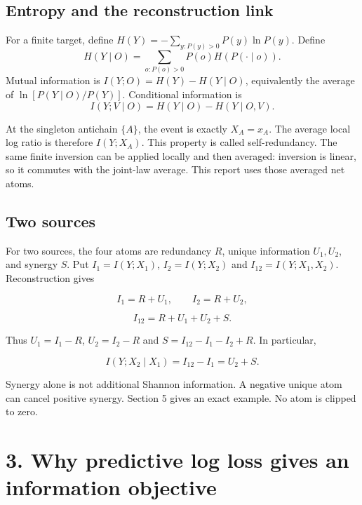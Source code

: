 \documentclass[11pt,a4paper]{article}
\begin{document}
\subsection{Entropy and the reconstruction link}\label{entropy-and-the-reconstruction-link}

For a finite target, define \(H(Y)=-\sum_{y:P(y)>0}P(y)\ln P(y)\). Define \[H(Y\mid O)=\sum_{o:P(o)>0}P(o)H(P(\cdot\mid o)).\] Mutual information is \(I(Y;O)=H(Y)-H(Y\mid O)\), equivalently the average of \(\ln[P(Y\mid O)/P(Y)]\). Conditional information is \[I(Y;V\mid O)=H(Y\mid O)-H(Y\mid O,V).\]

At the singleton antichain \(\{A\}\), the event is exactly \(X_A=x_A\). The average local log ratio is therefore \(I(Y;X_A)\). This property is called self-redundancy. The same finite inversion can be applied locally and then averaged: inversion is linear, so it commutes with the joint-law average. This report uses those averaged net atoms.

\par{}

\subsection{Two sources}\label{two-sources}

For two sources, the four atoms are redundancy \(R\), unique information \(U_1,U_2\), and synergy \(S\). Put \(I_1=I(Y;X_1)\), \(I_2=I(Y;X_2)\) and \(I_{12}=I(Y;X_1,X_2)\). Reconstruction gives

\[
I_1=R+U_1,\qquad I_2=R+U_2,
\]

\[
I_{12}=R+U_1+U_2+S.
\]

Thus \(U_1=I_1-R\), \(U_2=I_2-R\) and \(S=I_{12}-I_1-I_2+R\). In particular,

\[
\boxed{I(Y;X_2\mid X_1)=I_{12}-I_1=U_2+S.}
\]

Synergy alone is not additional Shannon information. A negative unique atom can cancel positive synergy. Section 5 gives an exact example. No atom is clipped to zero.

\par{}

\section{3. Why predictive log loss gives an information objective}\label{why-predictive-log-loss-gives-an-information-objective}
\end{document}
